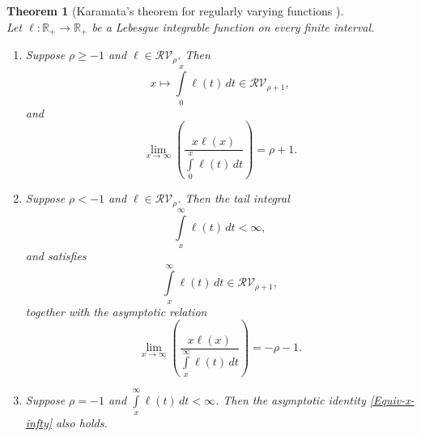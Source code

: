 \documentclass[12pt,reqno]{amsart}
\theoremstyle{plain}
\newtheorem{thm}{Theorem}[section]
\theoremstyle{definition}
\theoremstyle{remark}
\numberwithin{equation}{section}
\renewcommand{\L}{\ell}
\begin{document}
\begin{thm}[Karamata’s theorem for regularly varying functions {\cite{Karama1, Haan}}]\quad\\
\label{RVF-asymp}
Let $\L : \mathbb{R}_+ \to \mathbb{R}_+$ be a Lebesgue integrable function on every finite interval.

\begin{enumerate}[label=(\roman*)]
    \item Suppose $\rho \geq -1$ and $\L \in \mathcal{RV}_\rho$. Then
    $$
   x\longmapsto \int\limits_0^x \L(t) \, dt \in \mathcal{RV}_{\rho+1},
    $$
    and
    \begin{equation}
        \label{Equiv-0-x}
        \lim_{x \to \infty} \left(\frac{x \L(x)}{\int\limits_0^x \L(t) \, dt}\right) = \rho + 1.
    \end{equation}

    \item Suppose $\rho < -1$ and $\L \in \mathcal{RV}_\rho$. Then the tail integral
    $$
    \int\limits_x^\infty \L(t) \, dt < \infty,
    $$
    and satisfies
    $$
    \int\limits_x^\infty \L(t) \, dt \in \mathcal{RV}_{\rho+1},
    $$
    together with the asymptotic relation
    \begin{equation}
        \label{Equiv-x-infty}
        \lim_{x \to \infty} \left(\frac{x \L(x)}{\int\limits_x^\infty \L(t) \, dt}\right) = -\rho - 1.
    \end{equation}
    \item Suppose $\rho = -1$ and $\int\limits_x^\infty \L(t) \, dt < \infty$. Then the asymptotic identity \eqref{Equiv-x-infty} also holds.
\end{enumerate}
\end{thm}
\end{document}
